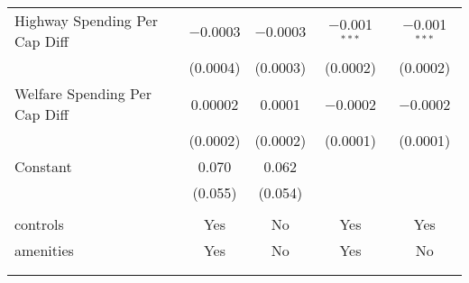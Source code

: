 \begin{table}[!htbp]
\begin{tabular}{@{\extracolsep{5pt}}lcccc}
  Highway Spending Per Cap Diff & $-$0.0003 & $-$0.0003 & $-$0.001$^{***}$ & $-$0.001$^{***}$ \\ 
  & (0.0004) & (0.0003) & (0.0002) & (0.0002) \\ 
  Welfare Spending Per Cap Diff & 0.00002 & 0.0001 & $-$0.0002 & $-$0.0002 \\ 
  & (0.0002) & (0.0002) & (0.0001) & (0.0001) \\ 
  Constant & 0.070 & 0.062 &  &  \\ 
  & (0.055) & (0.054) &  &  \\ 
 \hline \\[-1.8ex] 
controls & Yes & No & Yes & Yes \\ 
amenities & Yes & No & Yes & No \\ 
\hline \\[-1.8ex] 
\hline 
\hline \\[-1.8ex] 
\end{tabular} 
\end{table} 
